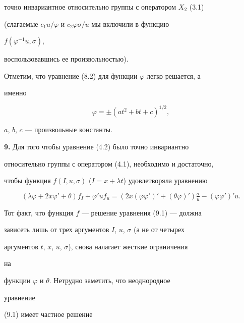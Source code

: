 точно инвариантное относительно группы с оператором $X_2$ (3.1) 


(слагаемые $c_1u/\varphi$ и $c_2\varphi\sigma/u$ мы включили в функцию 


$f(\varphi^{-1}u,\sigma)$, 


воспользовавшись ее произвольностью). 


 


Отметим, что уравнение (8.2) для функции $\varphi$ легко решается, а 


именно 


\begin{equation} 


\varphi=\pm(at^2+b t+c)^{1/2},\tag{8.7} 


\end{equation} 


$a$, $b$, $c$ --- произвольные константы. 


\medskip 


 


{\bf 9.} Для того чтобы уравнение (4.2) было точно инвариантно 


относительно группы с оператором (4.1), необходимо и достаточно, 


чтобы функция $f(I,u,\sigma)$ ($I=x+\lambda t$) удовлетворяла уравнению 


\begin{equation} 


(\lambda\varphi+2x\varphi'+\theta)f_I+ 


\varphi'u f_u=(2x(\varphi\varphi')'+ 


(\theta\varphi)')\tfrac{\sigma}{u}- 


(\varphi\varphi')'u.\tag{9.1} 


\end{equation} 


Тот факт, что функция $f$ --- решение уравнения (9.1) --- должна 


зависеть лишь от трех аргументов $I$, $u$, $\sigma$ (а не от четырех 


аргументов $t$, $x$, $u$, $\sigma$), снова налагает жесткие ограничения 


на 


функции $\varphi$ и $\theta$. Нетрудно заметить, что неоднородное 


уравнение 


(9.1) имеет частное решение 


$$ 


